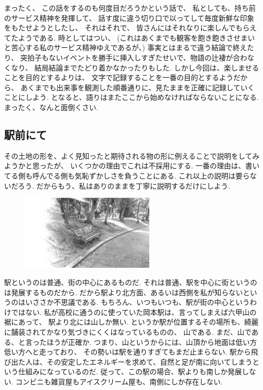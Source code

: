 まったく、
この話をするのも何度目だろうかという話で、
私としても、持ち前のサービス精神を発揮して、
話す度に違う切り口で以ってして毎度新鮮な印象をもたせようとしたし、
それはそれで、
皆さんにはそれなりに楽しんでもらえてたようである.
時としてはつい、
(これはあくまでも観客を飽き飽きさせまいと苦心する私のサービス精神ゆえであるが、)
事実とはまるで違う結論で終えたり、
突拍子もないイベントを勝手に挿入しすぎたせいで、物語の辻褄が合わなくなり、
結局結論までたどり着かなかったりもした.
しかし今回は、楽しませることを目的とするよりは、
文字で記録することを一番の目的とするようだから、
あくまでも出来事を観測した順番通りに、見たままを正確に記録していくことにしよう.
となると、語りはまたここから始めなければならないことになる.
まったく、なんと面倒くさい.

\subsection*{駅前にて}

その土地の形を、よく見知ったと期待される物の形に例えることで説明をしてみようかと思ったが、
いくつかの理由でこれは不採用にする.
一番の理由は、書いてる側も呼んでる側も気恥ずかしさを負うことにある.
これ以上の説明は要らないだろう.
だからもう、私はありのままを丁寧に説明するだけにしよう.

\begin{figure}
  \hspace*{-.1\textwidth}
\includegraphics[width=0.58\textwidth,bb=0 0 1600 900]{img/park1.jpg}
\end{figure}

駅というのは普通、街の中心にあるものだ.
それは普通、駅を中心に街というのは発展するものだから.
だから駅より北方面、あるいは西側を私が知らないというのはいささか不思議である.
もちろん、いつもいつも、駅が街の中心というわけではない.
私が高校に通うのに使っていた岡本駅は、言ってしまえば六甲山の裾にあって、
駅より北には山しか無い.
というか駅が位置するその場所も、綺麗に舗装されてかなり気づきにくくはなっているものの、
山である.
まだ、山である、と言ったほうが正確か.
つまり、山というからには、山頂から地面は低い方低い方へと走っており、
その勢いは駅を通りすぎてもまだ止まらない.
駅から飛び出た人は、その安定したエネルギーを求めて、自然と足が南に向いてしまうという仕組みになっているのだ.
従って、この駅の場合、駅よりも南しか発展しない.
コンビニも雑貨屋もアイスクリーム屋も、南側にしか存在しない.


